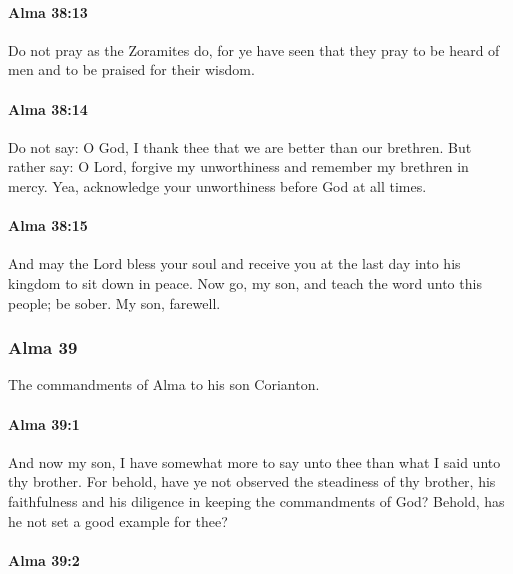 		\paragraph{Alma 38:13} %
			\label{ALMA-38-13}

			Do not pray as the Zoramites do,
			for ye have seen that they pray to be heard of men
			and to be praised for their wisdom.

		\paragraph{Alma 38:14} %
			\label{ALMA-38-14}

			Do not say:
			O God, I thank thee that we are better than our brethren.
			But rather say:
			O Lord, forgive my unworthiness
			and remember my brethren in mercy.
			Yea, acknowledge your unworthiness before God at all times.

		\paragraph{Alma 38:15} %
			\label{ALMA-38-15}

			And may the Lord bless your soul
			and receive you at the last day into his kingdom to sit down in peace.
			Now go, my son, and teach the word unto this people;
			be sober.
			My son, farewell.

	\subsubsection{Alma 39} %
		\label{ALMA-39}

		The commandments of Alma to his son Corianton.
		
		\paragraph{Alma 39:1} %
			\label{ALMA-39-1}

			And now my son, I have somewhat more to say unto thee
			than what I said unto thy brother.
			For behold, have ye not observed the steadiness of thy brother,
			his faithfulness and his diligence in keeping the commandments of God?
			Behold, has he not set a good example for thee?

		\paragraph{Alma 39:2} %
			\label{ALMA-39-2}

